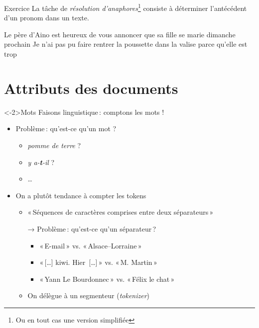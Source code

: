 \documentclass[xcolor={svgnames}, french]{beamer}
\title{\titlepagetitle}
\subtitle{\titlepagesubtitle}
\author{\textbf{\myname} (\mylab)}
\institute{}
\date{\tiny Version {\yyyymmdddate\today}T\currenttime}
\begin{document}

\begin{frame}[plain]
	\titlepage %
\end{frame}

\begin{frame}{Exercice}
	La tâche de \emph{résolution d'anaphores}\footnote{Ou en tout cas une version simplifiée} consiste à déterminer l'antécédent d'un pronom dans un texte.
	\vspace{\bigskipamount}

	\begin{overprint}
		 \alert<3>{Le père d'Aino} est heureux de vous annoncer que \alert{sa} fille se marie dimanche prochain
		\onslide<4-> Je n'ai pas pu faire rentrer \alert<5>{la poussette} dans \alert<6->{la valise} parce qu'\alert{elle} est trop \alt<4-5>{grande}{\textbf<6>{petite}}
	\end{overprint}

\end{frame}

\section{Attributs des documents}

\begin{frame}<-2>{Mots}
	Faisons  linguistique : comptons les \alert{mots} !
	\begin{itemize}
		\item Problème : qu'est-ce qu'un mot ?
			\begin{itemize}
				\item \emph{pomme de terre} ?
				\item \emph{y a-\textbf{t}-il} ?
				\item …
			\end{itemize}
		\item On a plutôt tendance à compter les \alert{tokens}
			\begin{itemize}
				\item « Séquences de caractères comprises entre deux séparateurs »
				\item[→] Problème : qu'est-ce qu'un séparateur ? \begin{itemize}
					\item « E-mail » vs. « Alsace–Lorraine »
					\item « […] kiwi. Hier […] » vs. « M. Martin »
					\item « Yann Le Bourdonnec » vs. « Félix le chat »
				\end{itemize}
				\item On délègue à un segmenteur (\emph{tokenizer})
			\end{itemize}
	\end{itemize}
\end{frame}
\end{document}
